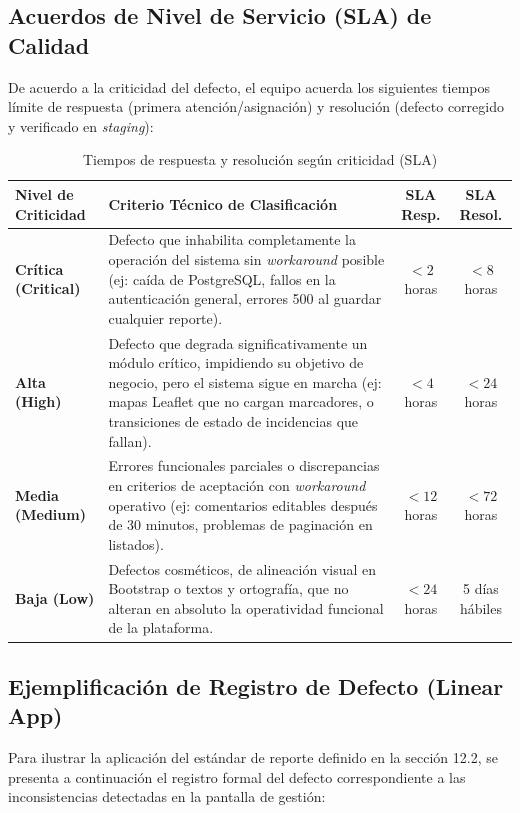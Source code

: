 \subsection{Acuerdos de Nivel de Servicio (SLA) de Calidad}
De acuerdo a la criticidad del defecto, el equipo acuerda los siguientes tiempos límite de respuesta (primera atención/asignación) y resolución (defecto corregido y verificado en \textit{staging}):

\begin{table}[htbp]
\centering
\small
\begin{tabularx}{\textwidth}{l X c c}
\toprule
\textbf{Nivel de Criticidad} & \textbf{Criterio Técnico de Clasificación} & \textbf{SLA Resp.} & \textbf{SLA Resol.} \\
\midrule
\textbf{Crítica (Critical)} & 
Defecto que inhabilita completamente la operación del sistema sin \textit{workaround} posible (ej: caída de PostgreSQL, fallos en la autenticación general, errores 500 al guardar cualquier reporte). & 
$< 2$ horas & 
$< 8$ horas \\
\midrule
\textbf{Alta (High)} & 
Defecto que degrada significativamente un módulo crítico, impidiendo su objetivo de negocio, pero el sistema sigue en marcha (ej: mapas Leaflet que no cargan marcadores, o transiciones de estado de incidencias que fallan). & 
$< 4$ horas & 
$< 24$ horas \\
\midrule
\textbf{Media (Medium)} & 
Errores funcionales parciales o discrepancias en criterios de aceptación con \textit{workaround} operativo (ej: comentarios editables después de 30 minutos, problemas de paginación en listados). & 
$< 12$ horas & 
$< 72$ horas \\
\midrule
\textbf{Baja (Low)} & 
Defectos cosméticos, de alineación visual en Bootstrap o textos y ortografía, que no alteran en absoluto la operatividad funcional de la plataforma. & 
$< 24$ horas & 
5 días hábiles \\
\bottomrule
\end{tabularx}
\caption{Tiempos de respuesta y resolución según criticidad (SLA)}
\label{tab:sla_defectos}
\end{table}

\subsection{Ejemplificación de Registro de Defecto (Linear App)}
Para ilustrar la aplicación del estándar de reporte definido en la sección 12.2, se presenta a continuación el registro formal del defecto correspondiente a las inconsistencias detectadas en la pantalla de gestión:

